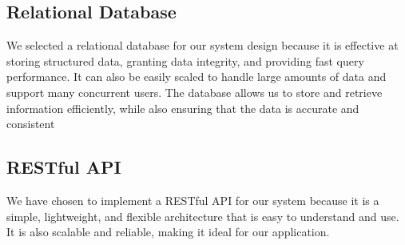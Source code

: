 \subsection{Relational Database}
We selected a relational database for our system design because it is effective at storing structured data, granting data integrity, and providing fast query performance. It can also be easily scaled to handle large amounts of data and support many concurrent users. The database allows us to store and retrieve information efficiently, while also ensuring that the data is accurate and consistent

\subsection{RESTful API}
We have chosen to implement a RESTful API for our system because it is a simple, lightweight, and flexible architecture that is easy to understand and use. It is also scalable and reliable, making it ideal for our application.\\


